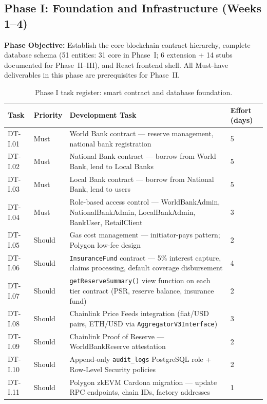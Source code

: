 \documentclass[12pt,a4paper]{report}
\newcommand{\tableheadcolor}{\rowcolor{TableHeadBg}}
\begin{document}
\subsection{Phase I: Foundation and Infrastructure (Weeks 1--4)}

\textbf{Phase Objective:} Establish the core blockchain contract hierarchy,
complete database schema (51 entities: 31 core in Phase~I; 6 extension + 14 stubs documented for Phase~II--III), and React frontend shell.
All Must-have deliverables in this phase are prerequisites for Phase~II.

\begin{table}[H]
\centering
\caption[Phase I task register]{Phase I task register: smart contract and database foundation.%
\footnotemark}
\label{tab:phaseI-contracts}
\small
\begin{tabular}{p{1.8cm}p{1.8cm}p{7.5cm}p{1.5cm}}
\toprule
\tableheadcolor
\textbf{Task} & \textbf{Priority} & \textbf{Development Task} & \textbf{Effort (days)} \\
\midrule
DT-I.01 & Must & World Bank contract --- reserve management, national bank registration & 5 \\
DT-I.02 & Must & National Bank contract --- borrow from World Bank, lend to Local Banks & 5 \\
DT-I.03 & Must & Local Bank contract --- borrow from National Bank, lend to users & 5 \\
DT-I.04 & Must & Role-based access control --- WorldBankAdmin, NationalBankAdmin, LocalBankAdmin, BankUser, RetailClient & 3 \\
DT-I.05 & Should & Gas cost management --- initiator-pays pattern; Polygon low-fee design & 2 \\
DT-I.06 & Should & \texttt{InsuranceFund} contract --- 5\% interest capture, claims processing, default coverage disbursement & 4 \\
DT-I.07 & Should & \texttt{getReserveSummary()} view function on each tier contract (PSR, reserve balance, insurance fund) & 2 \\
DT-I.08 & Should & Chainlink Price Feeds integration (fiat/USD pairs, ETH/USD via \texttt{AggregatorV3Interface}) & 3 \\
DT-I.09 & Should & Chainlink Proof of Reserve --- WorldBankReserve attestation & 2 \\
DT-I.10 & Should & Append-only \texttt{audit\_logs} PostgreSQL role + Row-Level Security policies & 2 \\
DT-I.11 & Should & Polygon zkEVM Cardona migration --- update RPC endpoints, chain IDs, factory addresses & 1 \\

\end{tabular}
\end{table}
\end{document}
